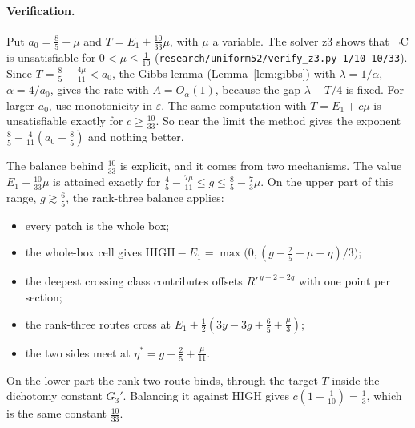 \paragraph{Verification.} Put $a_0=\tfrac85+\mu$ and $T=E_1+\tfrac{10}{33}\mu$, with $\mu$ a variable.
The solver z3 shows that $\neg\mathrm C$ is unsatisfiable for $0<\mu\le\tfrac1{10}$
(\texttt{research/uniform52/verify\_z3.py 1/10 10/33}). Since $T=\tfrac85-\tfrac{4\mu}{11}<a_0$, the Gibbs lemma
(Lemma~\ref{lem:gibbs}) with $\lambda=1/\alpha$, $\alpha=4/a_0$, gives the rate with $A=O_\alpha(1)$, because the gap $\lambda-T/4$ is fixed. For larger
$a_0$, use monotonicity in $\varepsilon$. The same computation with $T=E_1+c\mu$ is unsatisfiable exactly
for $c\ge\tfrac{10}{33}$. So near the limit the method gives the exponent $\tfrac85-\tfrac4{11}(a_0-\tfrac85)$
and nothing better.

The balance behind $\tfrac{10}{33}$ is explicit, and it comes from two mechanisms.
The value $E_1+\tfrac{10}{33}\mu$ is attained exactly for $\tfrac45-\tfrac{7\mu}{11}\le g\le\tfrac85-\tfrac73\mu$.
On the upper part of this range, $g\gtrsim\tfrac65$, the rank-three balance applies:
\begin{itemize}\setlength\itemsep{0pt}
\item every patch is the whole box;
\item the whole-box cell gives $\mathrm{HIGH}-E_1=\max\big(0,(g-\tfrac25+\mu-\eta)/3\big)$;
\item the deepest crossing class contributes offsets $R'^{\,y+2-2g}$ with one point per section;
\item the rank-three routes cross at $E_1+\tfrac12(3y-3g+\tfrac65+\tfrac\mu3)$;
\item the two sides meet at $\eta^*=g-\tfrac25+\tfrac\mu{11}$.
\end{itemize}
On the lower part the rank-two route binds, through the target $T$ inside the dichotomy constant $G_3'$.
Balancing it against $\mathrm{HIGH}$ gives $c(1+\tfrac1{10})=\tfrac13$, which is the same constant $\tfrac{10}{33}$.
